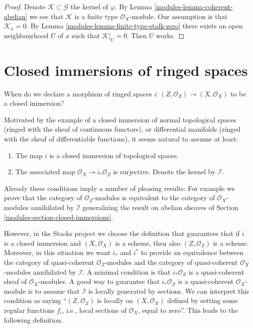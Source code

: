\begin{proof}

Denote $\mathcal{K} \subset \mathcal{G}$ the kernel of $\varphi$.
By Lemma \ref{modules-lemma-coherent-abelian} we see that $\mathcal{K}$ is
a finite type $\mathcal{O}_X$-module. Our assumption is that
$\mathcal{K}_x = 0$. By Lemma \ref{modules-lemma-finite-type-stalk-zero}
there exists an open neighbourhood $U$ of $x$ such that $\mathcal{K}|_U = 0$.
Then $U$ works.
\end{proof}

\section{Closed immersions of ringed spaces}
\label{modules-section-closed-immersion}
When do we declare a morphism of ringed spaces
$i : (Z, \mathcal{O}_Z) \to (X, \mathcal{O}_X)$
to be a closed immersion?

\medskip\noindent
Motivated by the example of a closed immersion of normal topological spaces
(ringed with the sheaf of continuous functors), or differential manifolds
(ringed with the sheaf of differentiable functions), it seems natural to
assume at least:
\begin{enumerate}
\item The map $i$ is a closed immersion of topological spaces.
\item The associated map $\mathcal{O}_X \to i_*\mathcal{O}_Z$
is surjective. Denote the kernel by $\mathcal{I}$.
\end{enumerate}
Already these conditions imply a number of pleasing results: For example
we prove that the category of $\mathcal{O}_Z$-modules is equivalent to
the category of $\mathcal{O}_X$-modules annihilated by $\mathcal{I}$
generalizing the result on abelian sheaves of
Section \ref{modules-section-closed-immersions}.

\medskip\noindent
However, in the Stacks project we choose the
definition that guarantees that if $i$ is a closed immersion
and $(X, \mathcal{O}_X)$ is a scheme, then also $(Z, \mathcal{O}_Z)$
is a scheme. Moreover, in this situation we want $i_*$ and $i^*$
to provide an equivalence between the category of quasi-coherent
$\mathcal{O}_Z$-modules and the category of quasi-coherent
$\mathcal{O}_X$-modules annihilated by $\mathcal{I}$.
A minimal condition is that $i_*\mathcal{O}_Z$ is a
quasi-coherent sheaf of $\mathcal{O}_X$-modules.
A good way to guarantee that $i_*\mathcal{O}_Z$ is a
quasi-coherent $\mathcal{O}_X$-module is to assume that
$\mathcal{I}$ is locally generated by sections.
We can interpret this condition as saying ``$(Z, \mathcal{O}_Z)$ is
locally on $(X, \mathcal{O}_X)$ defined by setting some regular functions
$f_i$, i.e., local sections of $\mathcal{O}_X$, equal to zero''.
This leads to the following definition.

